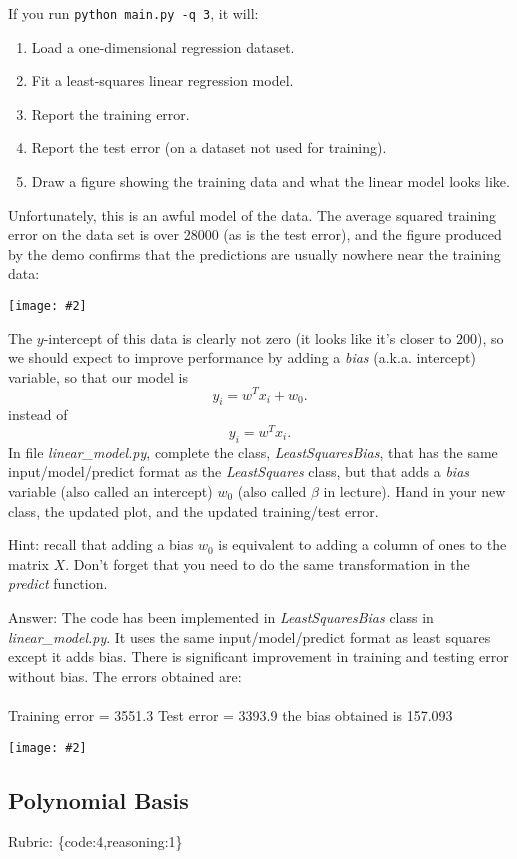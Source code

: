 \documentclass{article}
\def\rubric#1{\gre{Rubric: \{#1\}}}{}
\def\blu#1{{\color{blu}#1}}
\def\gre#1{{\color{gre}#1}}
\newcommand{\centerfig}[2]{\begin{center}\texttt{[image: \#2]}\end{center}}
\def\enum#1{\begin{enumerate}#1\end{enumerate}}
\begin{document}
If you run  \verb|python main.py -q 3|, it will:
\enum{
\item Load a one-dimensional regression dataset.
\item Fit a least-squares linear regression model.
\item Report the training error.
\item Report the test error (on a dataset not used for training).
\item Draw a figure showing the training data and what the linear model looks like.
}
Unfortunately, this is an awful model of the data. The average squared training error on the data set is over 28000
(as is the test error), and the figure produced by the demo confirms that the predictions are usually nowhere near
 the training data:
\centerfig{.5}{../figs/least_squares_no_bias.pdf}
The $y$-intercept of this data is clearly not zero (it looks like it's closer to $200$),
so we should expect to improve performance by adding a \emph{bias} (a.k.a. intercept) variable, so that our model is
\[
y_i = w^Tx_i + w_0.
\]
instead of
\[
y_i = w^Tx_i.
\]
\blu{In file \emph{linear\_model.py}, complete the class, \emph{LeastSquaresBias}, 
that has the same input/model/predict format as the \emph{LeastSquares} class, 
but that adds a \emph{bias} variable (also called an intercept) $w_0$ (also called $\beta$ in lecture). Hand in your new class, the updated plot, 
and the updated training/test error.}

Hint: recall that adding a bias $w_0$ is equivalent to adding a column of ones to the matrix $X$. Don't forget that you need to do the same transformation in the \emph{predict} function.

\blu{Answer:} The code has been implemented in \emph{LeastSquaresBias} class in \emph{linear\_model.py}. It uses the same input/model/predict format as least squares except it adds bias. There is significant improvement in training and testing error without bias. The errors obtained are: \\ \\
Training error = 3551.3
\newline Test error     = 3393.9
\newline the bias obtained is 157.093
\centerfig{.7}{../figs/least_squares_bias.pdf}


\subsection{Polynomial Basis}
\rubric{code:4,reasoning:1}
\end{document}

